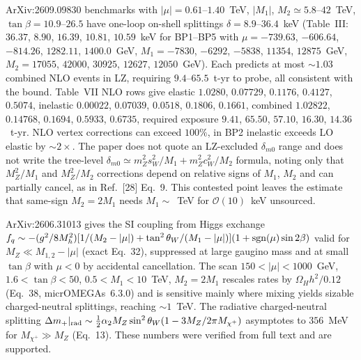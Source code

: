 \documentclass[11pt,a4paper]{article}
\begin{document}
ArXiv:2609.09830 benchmarks with $|\mu|=0.61$--$1.40$~TeV, $|M_{1}|$, $M_{2}\simeq5.8$--$42$~TeV, $\tan\beta=10.9$--$26.5$ have one-loop on-shell splittings $\delta=8.9$--$36.4$~keV (Table~III: $36.37$, $8.90$, $16.39$, $10.81$, $10.59$~keV for BP1--BP5 with $\mu=-739.63$, $-606.64$, $-814.26$, $1282.11$, $1400.0$~GeV, $M_{1}=-7830$, $-6292$, $-5838$, $11354$, $12875$~GeV, $M_{2}=17055$, $42000$, $30925$, $12627$, $12050$~GeV). Each predicts at most $\sim1.03$ combined NLO events in LZ, requiring $9.4$--$65.5$~t-yr to probe, all consistent with the bound. Table~VII NLO rows give elastic $1.0280$, $0.07729$, $0.1176$, $0.4127$, $0.5074$, inelastic $0.00022$, $0.07039$, $0.0518$, $0.1806$, $0.1661$, combined $1.02822$, $0.14768$, $0.1694$, $0.5933$, $0.6735$, required exposure $9.41$, $65.50$, $57.10$, $16.30$, $14.36$~t-yr. NLO vertex corrections can exceed $100\%$, in BP2 inelastic exceeds LO elastic by $\sim2\times$. The paper does not quote an LZ-excluded $\delta_{m0}$ range and does not write the tree-level $\delta_{m0}\simeq m_{Z}^{2}s_{W}^{2}/M_{1}+m_{Z}^{2}c_{W}^{2}/M_{2}$ formula, noting only that $M_{Z}^{2}/M_{1}$ and $M_{Z}^{2}/M_{2}$ corrections depend on relative signs of $M_{1}$, $M_{2}$ and can partially cancel, as in Ref.~[28] Eq.~9. This contested point leaves the estimate that same-sign $M_{2}=2M_{1}$ needs $M_{1}\sim$~TeV for $\mathcal{O}(10)$~keV unsourced.

ArXiv:2606.31013 gives the SI coupling from Higgs exchange $f_{q}\sim-(g^{2}/8M_{h}^{2})[1/(M_{2}-|\mu|)+\tan^{2}\theta_{W}/(M_{1}-|\mu|)](1+{\rm sgn}(\mu)\sin2\beta)$ valid for $M_{Z}\ll M_{1,2}-|\mu|$ (exact Eq.~32), suppressed at large gaugino mass and at small $\tan\beta$ with $\mu<0$ by accidental cancellation. The scan $150<|\mu|<1000$~GeV, $1.6<\tan\beta<50$, $0.5<M_{1}<10$~TeV, $M_{2}=2M_{1}$ rescales rates by $\Omega_{H}h^{2}/0.12$ (Eq.~38, micrOMEGAs~6.3.0) and is sensitive mainly where mixing yields sizable charged-neutral splittings, reaching $\sim1$~TeV. The radiative charged-neutral splitting $\Delta m_{+}|_{\rm rad}\sim\frac12\alpha_{2}M_{Z}\sin^{2}\theta_{W}(1-3M_{Z}/2\pi M_{\chi^{+}})$ asymptotes to $356$~MeV for $M_{\chi^{+}}\gg M_{Z}$ (Eq.~13). These numbers were verified from full text and are supported.
\end{document}
